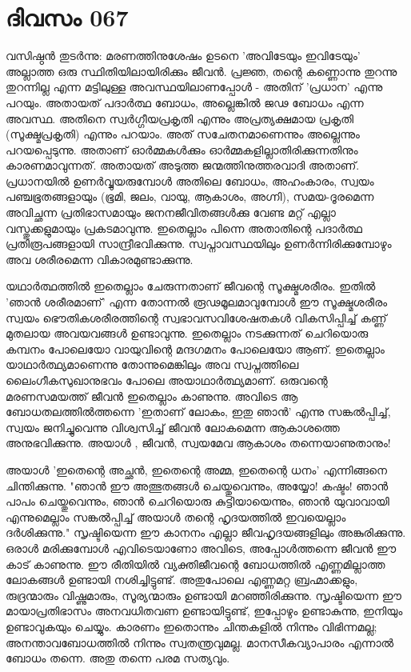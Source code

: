 \newpage
\section{ദിവസം 067}


വസിഷ്ഠന്‍ തുടര്‍ന്നു: മരണത്തിനുശേഷം  ഉടനെ 'അവിടേയും ഇവിടേയും' അല്ലാത്ത ഒരു സ്ഥിതിയിലായിരിക്കും ജീവൻ. പ്രജ്ഞ, തന്റെ കണ്ണൊന്നു തുറന്നു തുറന്നില്ല എന്ന മട്ടിലുള്ള അവസ്ഥയിലാണപ്പോള്‍ - അതിന്‌ 'പ്രധാന' എന്നു പറയും. അതായത്‌ പദാര്‍ത്ഥ ബോധം, അല്ലെങ്കിൽ ജഢ ബോധം എന്ന അവസ്ഥ. അതിനെ സ്വര്‍ഗ്ഗീയപ്രകൃതി എന്നും അപ്രത്യക്ഷമായ പ്രകൃതി (സൂക്ഷ്മപ്രകൃതി) എന്നും പറയാം. അത്‌ സചേതനമാണെന്നും അല്ലെന്നും പറയപ്പെടുന്നു. അതാണ്‌ ഓര്‍മ്മകള്‍ക്കും ഓര്‍മ്മകളില്ലാതിരിക്കുന്നതിനും കാരണമാവുന്നത്‌. അതായത്‌ അടുത്ത ജന്മത്തിനുത്തരവാദി അതാണ്‌. പ്രധാനയില്‍ ഉണര്‍വ്വുയരുമ്പോള്‍ അതിലെ ബോധം, അഹംകാരം, സ്വയം പഞ്ചഭൂതങ്ങളായും (ഭൂമി, ജലം, വായു, ആകാശം, അഗ്നി), സമയ-ദൂരമെന്ന അവിച്ഛന്ന പ്രതിഭാസമായും ജനനജീവിതങ്ങള്‍ക്കു വേണ്ട മറ്റ് എല്ലാ വസ്തുക്കളുമായും പ്രകടമാവുന്നു. ഇതെല്ലാം പിന്നെ അതാതിന്റെ പദാര്‍ത്ഥ പ്രതിരൂപങ്ങളായി സാന്ദ്രീഭവിക്കുന്നു. സ്വപ്നാവസ്ഥയിലും ഉണര്‍ന്നിരിക്കുമ്പോഴും അവ ശരീരമെന്ന വികാരമുണ്ടാക്കുന്നു.

യഥാര്‍ത്ഥത്തില്‍ ഇതെല്ലാം ചേരുന്നതാണ്‌ ജീവന്റെ സൂക്ഷ്മശരീരം. ഇതില്‍ 'ഞാന്‍ ശരീരമാണ്‌' എന്ന തോന്നല്‍ രൂഢമൂലമാവുമ്പോള്‍ ഈ സൂക്ഷ്മശരീരം സ്വയം ഭൌതികശരീരത്തിന്റെ സ്വഭാവസവിശേഷതകള്‍ വികസിപ്പിച്ച്‌ കണ്ണ്‌  മുതലായ അവയവങ്ങള്‍ ഉണ്ടാവുന്നു. ഇതെല്ലാം നടക്കുന്നത്‌ ചെറിയൊരു കമ്പനം പോലെയോ വായുവിന്റെ മന്ദഗമനം പോലെയോ ആണ്‌. ഇതെല്ലാം യാഥാര്‍ത്ഥ്യമാണെന്നു തോന്നുമെങ്കിലും അവ സ്വപ്നത്തിലെ ലൈംഗീകസുഖാനുഭവം പോലെ അയാഥാര്‍ത്ഥ്യമാണ്‌. ഒരുവന്റെ മരണസമയത്ത്‌ ജീവന്‍ ഇതെല്ലാം കാണുന്നു. അവിടെ ആ ബോധതലത്തില്‍ത്തന്നെ 'ഇതാണ്‌ ലോകം, ഇതു ഞാന്‍' എന്നു സങ്കല്‍പ്പിച്ച്‌, സ്വയം ജനിച്ചുവെന്നു വിശ്വസിച്ച്‌ ജീവന്‍ ലോകമെന്ന ആകാശത്തെ അനുഭവിക്കുന്നു. അയാള്‍ , ജീവന്‍, സ്വയമേവ ആകാശം തന്നെയാണുതാനും! 

അയാള്‍ 'ഇതെന്റെ അച്ഛന്‍, ഇതെന്റെ അമ്മ, ഇതെന്റെ ധനം' എന്നിങ്ങനെ ചിന്തിക്കുന്നു. "ഞാന്‍ ഈ അത്ഭുതങ്ങള്‍ ചെയ്തുവെന്നും, അയ്യോ! കഷ്ടം! ഞാന്‍ പാപം ചെയ്തുവെന്നും, ഞാന്‍ ചെറിയൊരു കുട്ടിയായെന്നും, ഞാന്‍ യുവാവായി എന്നുമെല്ലാം സങ്കല്‍പ്പിച്ച്‌ അയാള്‍ തന്റെ ഹൃദയത്തില്‍ ഇവയെല്ലാം ദര്‍ശിക്കുന്നു." സൃഷ്ടിയെന്ന ഈ കാനനം എല്ലാ ജീവഹൃദയങ്ങളിലും അങ്കുരിക്കുന്നു. ഒരാള്‍ മരിക്കുമ്പോള്‍ എവിടെയാണോ അവിടെ, അപ്പോള്‍ത്തന്നെ ജീവന്‍ ഈ കാട്‌ കാണുന്നു. ഈ രീതിയില്‍ വ്യക്തിജീവന്റെ ബോധത്തില്‍ എണ്ണമില്ലാത്ത ലോകങ്ങള്‍ ഉണ്ടായി നശിച്ചിട്ടുണ്ട്‌. അതുപോലെ എണ്ണമറ്റ ബ്രഹ്മാക്കളും, രുദ്രന്മാരും വിഷ്ണുമാരും, സൂര്യന്മാരും ഉണ്ടായി മറഞ്ഞിരിക്കുന്നു. സൃഷ്ടിയെന്ന ഈ മായാപ്രതിഭാസം അനവധിതവണ ഉണ്ടായിട്ടുണ്ട്‌, ഇപ്പോഴും ഉണ്ടാകുന്നു, ഇനിയും ഉണ്ടാവുകയും ചെയ്യും. കാരണം ഇതൊന്നും ചിന്തകളില്‍ നിന്നും വിഭിന്നമല്ല; അനന്താവബോധത്തില്‍ നിന്നും സ്വതന്ത്രവുമല്ല. മാനസീകവ്യാപാരം എന്നാല്‍ ബോധം തന്നെ. അതു തന്നെ പരമ സത്യവും.

